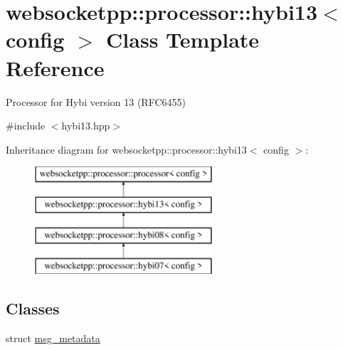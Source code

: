 \hypertarget{classwebsocketpp_1_1processor_1_1hybi13}{}\section{websocketpp\+:\+:processor\+:\+:hybi13$<$ config $>$ Class Template Reference}
\label{classwebsocketpp_1_1processor_1_1hybi13}


Processor for Hybi version 13 (R\+F\+C6455)  




{\ttfamily \#include $<$hybi13.\+hpp$>$}

Inheritance diagram for websocketpp\+:\+:processor\+:\+:hybi13$<$ config $>$\+:\begin{figure}[H]
\begin{center}
\leavevmode
\includegraphics[height=4.000000cm]{classwebsocketpp_1_1processor_1_1hybi13}
\end{center}
\end{figure}
\subsection*{Classes}
\begin{DoxyCompactItemize}
\item 
struct \hyperlink{structwebsocketpp_1_1processor_1_1hybi13_1_1msg__metadata}{msg\+\_\+metadata}
\end{DoxyCompactItemize}
